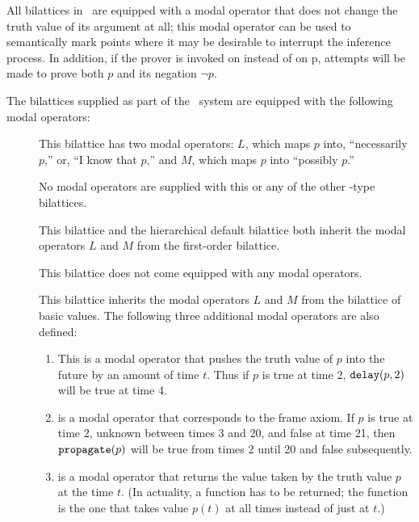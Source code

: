 All bilattices in \mvl\ are equipped with a modal operator 
that does not change the truth value of its argument at all; this
modal operator can be used to semantically mark points where it may be
desirable to interrupt the inference process.  In addition, if the
prover is invoked on  instead of on \type p, attempts
will be made to prove both $p$ and its negation $\neg p$.

The bilattices supplied as part of the \mvl\ system are equipped with
the following modal operators:

 \begin{description}
 \item [] This bilattice has two
modal operators: $L$, which maps $p$ into, ``necessarily $p$,'' or,
``I know that $p$,'' and $M$, which maps $p$ into ``possibly $p$.''
 \item []  No modal operators are supplied with
this or any of the other \atms-type bilattices.
 \item [] This bilattice and the hierarchical
default bilattice both inherit the modal operators $L$ and $M$ from the
first-order bilattice.
 \item [] This bilattice does not
come equipped with any modal operators.
 \item [] This bilattice inherits the modal
operators $L$ and $M$ from the bilattice of basic values.  The
following three additional modal operators are also defined:
 \begin{enumerate}
 \item {} This is a modal operator that pushes the
truth value of $p$ into the future by an amount of time $t$.  Thus if
$p$ is true at time 2, $\mbox{\tt delay}(p,2)$ will be true at time 4.
 \item {} is a modal operator that corresponds to the frame
axiom.  If $p$ is true at time 2, unknown between times 3 and 20, and false
at time 21, then $\mbox{\tt propagate}(p)$ will be true from times 2 until 20
and false subsequently.
 \item {} is a modal operator that returns the value taken
by the truth value $p$ at the time $t$.  (In actuality, a function has
to be returned; the function is the one that takes value $p(t)$ at all
times instead of just at $t$.)
 \end{enumerate}
 \end{description}

